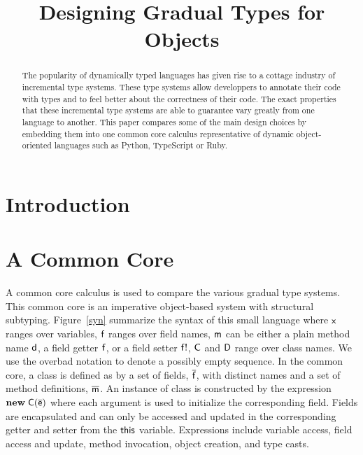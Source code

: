 \documentclass[preprint]{sigplanconf}
\newcommand{\m}{\M{\xt{m}}}
\newcommand{\e}{\M{\xt{e}}}
\renewcommand{\d}{\M{\xt{d}}}
\newcommand{\f}{\M{\xt{f}}}
\newcommand{\fb}{\M{\xt{f!}}}
\newcommand{\x}{\M{\xt{x}}}
\newcommand{\C}{\M{\xt{C}}}
\newcommand{\D}{\M{\xt{D}}}
\newcommand{\this}{\M{\xt{this}}}
\renewcommand{\d}{\M{\xt{d}}}
\newcommand{\new}{\M{\bt{new}}}
\newcommand{\New}[2]{\M{\new\;#1({#2})}}
\newcommand{\M}[1]{\ensuremath{#1}\xspace}
\newcommand{\xt}[1]{\sf{#1}}
\newcommand{\bt}[1]{\xt{\bf #1}}
\renewcommand{\b}[1]{\M{\overline{#1}}}
\begin{document}
\title{Designing Gradual Types for Objects} 
\maketitle

\begin{abstract}
The popularity of dynamically typed languages has given rise to a cottage
industry of incremental type systems. These type systems allow developpers
to annotate their code with types and to feel better about the correctness
of their code.  The exact properties that these incremental type systems are
able to guarantee vary greatly from one language to another. This paper
compares some of the main design choices by embedding them into one common
core calculus representative of dynamic object-oriented languages such as
Python, TypeScript or Ruby.
\end{abstract} 

\section{Introduction}

\newpage

\section{A Common Core}

A common core calculus is used to compare the various gradual type
systems. This common core is an imperative object-based system with
structural subtyping.  Figure~\ref{syn} summarize the syntax of this small
language where \x ranges over variables, \f ranges over field names, \m can
be either a plain method name \d, a field getter \f, or a field setter \fb,
\C and \D range over class names. We use the overbad notation to denote a
possibly empty sequence. In the common core, a class is defined as by a set
of fields, \b\f, with distinct names and a set of method definitions,
\b\m. An instance of class is constructed by the expression \New\C{\b\e} where
each argument is used to initialize the corresponding field. Fields are
encapsulated and can only be accessed and updated in the corresponding
getter and setter from the \this variable.  Expressions include variable
access, field access and update, method invocation, object creation, and
type casts.
\end{document}
